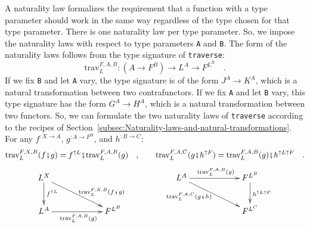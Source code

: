 A naturality law formalizes the requirement that a function with a
type parameter should work in the same way regardless of the type
chosen for that type parameter. There is one naturality law per type
parameter. So, we impose the naturality laws with respect to type
parameters \lstinline!A! and \lstinline!B!. The form of the naturality
laws follows from the type signature of \lstinline!traverse!:
\[
\text{trav}_{L}^{F,A,B}:(A\rightarrow F^{B})\rightarrow L^{A}\rightarrow F^{L^{B}}\quad.
\]
If we fix \lstinline!B! and let \lstinline!A! vary, the type signature
is of the form $J^{A}\rightarrow K^{A}$, which is a natural transformation
between two contrafunctors. If we fix \lstinline!A! and let \lstinline!B!
vary, this type signature has the form $G^{A}\rightarrow H^{A}$,
which is a natural transformation between two functors. So, we can
formulate the two naturality
laws of \lstinline!traverse! according to the recipes of Section~\ref{subsec:Naturality-laws-and-natural-transformations}.
For any $f^{:X\rightarrow A}$, $g^{:A\rightarrow F^{B}}$, and $h^{:B\rightarrow C}$:
\begin{equation}
\text{trav}_{L}^{F,X,B}(f\bef g)=f^{\uparrow L}\bef\text{trav}_{L}^{F,A,B}(g)\quad,\quad\quad\text{trav}_{L}^{F,A,C}(g\bef h^{\uparrow F})=\text{trav}_{L}^{F,A,B}(g)\bef h^{\uparrow L\uparrow F}\quad.\label{eq:naturality-laws-of-traverse}
\end{equation}
\[
\xymatrix{\xyScaleY{2.0pc}\xyScaleX{5.0pc}L^{X}\ar[rd]\sp(0.6){~~\text{trav}_{L}^{F,X,B}(f\bef g)}\ar[d]\sp(0.45){f^{\uparrow L}} &  & L^{A}\ar[rd]\sb(0.35){\text{trav}_{L}^{F,A,C}(g\bef h)~~}\ar[r]\sp(0.5){\text{trav}_{L}^{F,A,B}(g)} & F^{L^{B}}\ar[d]\sp(0.45){h^{\uparrow L\uparrow F}}\\
L^{A}\ar[r]\sb(0.5){\text{trav}_{L}^{F,A,B}(g)} & F^{L^{B}} &  & F^{L^{C}}
}
\]

